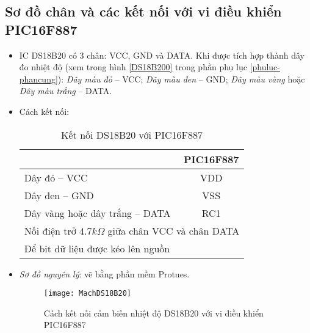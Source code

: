 \subsection{Sơ đồ chân và các kết nối với vi điều khiển PIC16F887}
\begin{itemize}
\item IC DS18B20 có 3 chân: VCC, GND và DATA. Khi được tích hợp thành dây đo nhiệt độ (xem trong hình \ref{DS18B200} trong phần phụ lục \ref{phuluc-phancung}): \textit{Dây màu đỏ} -- VCC; \textit{Dây màu đen} -- GND; \textit{Dây màu vàng} hoặc \textit{Dây màu trắng} -- DATA.
\item Cách kết nối:
\begin{table}[h]
\begin{center}
\begin{tabular}{|p{7cm}|c|}\hline
\centering{\textbf{DS18B20}} & \textbf{PIC16F887} \\ \hline
Dây đỏ -- VCC & VDD \\ \hline
Dây đen -- GND & VSS \\ \hline
Dây vàng hoặc dây trắng -- DATA & RC1 \\ \hline
\multicolumn{2}{|c|}{Nối điện trở $4.7k\Omega$ giữa chân VCC và chân DATA}\\ 
\multicolumn{2}{|l|}{Để bit dữ liệu được kéo lên nguồn}\\ \hline
\end{tabular}
\end{center}
\caption{Kết nối DS18B20 với PIC16F887}
\end{table}
\item \textit{Sơ đồ nguyên lý}: vẽ bằng phần mềm Protues.
\begin{figure}[h]
\begin{center}
\texttt{[image: MachDS18B20]}
\end{center}
\caption{Cách kết nối cảm biến nhiệt độ DS18B20 với vi điều khiển PIC16F887}
\end{figure}
\end{itemize}
